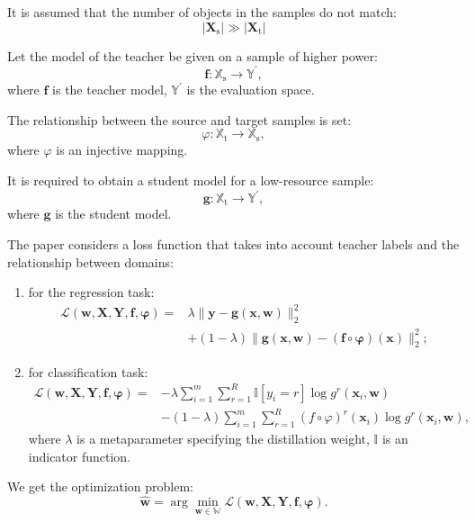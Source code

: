 \documentclass[12pt]{article}
\begin{document}
It is assumed that the number of objects in the samples do not match:
$$|\mathbf{X}_{\text{s}}| \gg |\mathbf{X}_{\text{t}}|$$

Let the model of the teacher be given on a sample of higher power:
$$\mathbf{f}: \mathbb{X}_{\text{s}} \rightarrow \mathbb{Y}^{\prime},$$
where $\mathbf{f}$ is the teacher model, $\mathbb{Y}^{\prime}$ is the evaluation space.

The relationship between the source and target samples is set:
$$\varphi: \mathbb{X}_{\text{t}} \rightarrow \mathbb{X}_{\text{s}},$$
where $\varphi$ is an injective mapping.

It is required to obtain a student model for a low-resource sample:
$$\mathbf{g}: \mathbb{X}_{\text{t}} \rightarrow \mathbb{Y}^{\prime},$$
where $\mathbf{g}$ is the student model.

The paper considers a loss function that takes into account teacher labels and the relationship between domains:
\begin{enumerate}
     \item for the regression task:
     \[
     \begin{aligned}
     \mathcal{L}(\mathbf{w,X,Y,f,\varphi})=&\lambda\|\mathbf{y}-\mathbf{g}(\mathbf{x},\mathbf{w} )\|_{2}^{2}\\
     &+(1-\lambda)\|\mathbf{g}(\mathbf{x},\mathbf{w})-(\mathbf{f}\circ \mathbf{\varphi})(\mathbf{x} )\|_{2}^{2};
     \end{aligned}
     \]
     \item for classification task:
     \[
     \begin{aligned}
     \mathcal{L}(\mathbf{w,X,Y,f,\varphi})=&-\lambda\sum\limits_{i=1}^{m}\sum\limits_{r=1}^{ R}\mathbb{I}[y_{i}=r]\log{g^{r}(\mathbf{x}_{i},\mathbf{w})}\\
     &-(1-\lambda)\sum\limits_{i=1}^{m}\sum\limits_{r=1}^{R}(f\circ \varphi)^{r}(\mathbf{x }_{i})\log{g^{r}(\mathbf{x}_{i},\mathbf{w})},
     \end{aligned}
     \]
     where $\lambda$ is a metaparameter specifying the distillation weight, $\mathbb{I}$ is an indicator function.
\end{enumerate}

We get the optimization problem:
$$\hat{\mathbf{w}} = \arg\min_{\mathbf{w} \in \mathbb{W}} \mathcal{L}(\mathbf{w,X,Y,f,\varphi} ).$$


\end{document}
